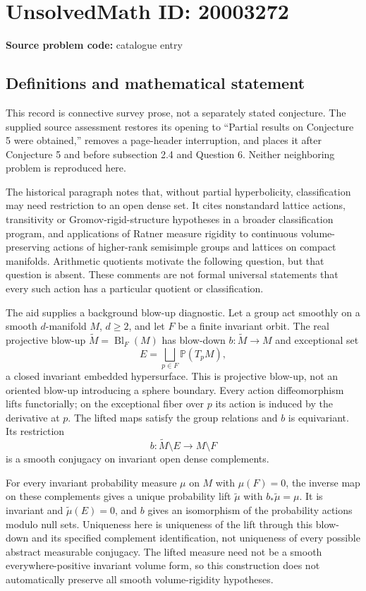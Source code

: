 \documentclass[11pt]{article}
\newcommand{\PP}{\mathbb{P}}
\begin{document}
\section*{UnsolvedMath ID: 20003272}
\textbf{Source problem code:} catalogue entry
\subsection{Definitions and mathematical statement}
This record is connective survey prose, not a separately stated conjecture. The supplied source assessment restores its opening to ``Partial results on Conjecture 5 were obtained,'' removes a page-header interruption, and places it after Conjecture 5 and before subsection 2.4 and Question 6. Neither neighboring problem is reproduced here.

The historical paragraph notes that, without partial hyperbolicity, classification may need restriction to an open dense set. It cites nonstandard lattice actions, transitivity or Gromov-rigid-structure hypotheses in a broader classification program, and applications of Ratner measure rigidity to continuous volume-preserving actions of higher-rank semisimple groups and lattices on compact manifolds. Arithmetic quotients motivate the following question, but that question is absent. These comments are not formal universal statements that every such action has a particular quotient or classification.

The aid supplies a background blow-up diagnostic. Let a group act smoothly on a smooth $d$-manifold $M$, $d\geq2$, and let $F$ be a finite invariant orbit. The real projective blow-up $\widetilde M=\operatorname{Bl}_F(M)$ has blow-down $b:\widetilde M\to M$ and exceptional set
\[
 E=\bigsqcup_{p\in F}\PP(T_pM),
\]
a closed invariant embedded hypersurface. This is projective blow-up, not an oriented blow-up introducing a sphere boundary. Every action diffeomorphism lifts functorially; on the exceptional fiber over $p$ its action is induced by the derivative at $p$. The lifted maps satisfy the group relations and $b$ is equivariant. Its restriction
\[
 b:\widetilde M\setminus E\longrightarrow M\setminus F
\]
is a smooth conjugacy on invariant open dense complements.

For every invariant probability measure $\mu$ on $M$ with $\mu(F)=0$, the inverse map on these complements gives a unique probability lift $\widetilde\mu$ with $b_*\widetilde\mu=\mu$. It is invariant and $\widetilde\mu(E)=0$, and $b$ gives an isomorphism of the probability actions modulo null sets. Uniqueness here is uniqueness of the lift through this blow-down and its specified complement identification, not uniqueness of every possible abstract measurable conjugacy. The lifted measure need not be a smooth everywhere-positive invariant volume form, so this construction does not automatically preserve all smooth volume-rigidity hypotheses.
\end{document}
